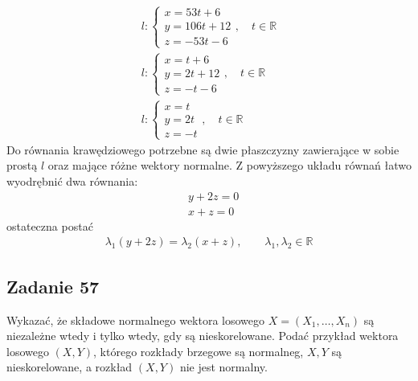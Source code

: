 \begin{gather*}
l:
\left \{
\begin{array}{l}
x=53t+6\\
y=106t+12\\
z=-53t-6
\end{array}
\right .,\quad t\in \mathbb R \\
l:
\left \{
\begin{array}{l}
x=t+6\\
y=2t+12\\
z=-t-6
\end{array}
\right .,\quad t\in \mathbb R \\
l:
\left \{
\begin{array}{l}
x=t\\
y=2t\\
z=-t
\end{array}
\right .,\quad t\in \mathbb R 
\end{gather*}
Do równania krawędziowego potrzebne są dwie płaszczyzny zawierające w sobie prostą $ l $ oraz mające różne wektory normalne. Z powyższego układu równań łatwo wyodrębnić dwa równania:
\begin{align*}
&y+2z=0\\
&x+z=0
\end{align*}
ostateczna postać
\begin{gather*}
\lambda_1(y+2z)=\lambda_2(x+z),\qquad\lambda_1,\lambda_2\in \mathbb R 
\end{gather*}



\subsection*{Zadanie 57}
Wykazać, że składowe normalnego wektora losowego $ X=(X_1,\dots,X_n) $ są niezależne wtedy i tylko wtedy, gdy są nieskorelowane. Podać przykład wektora losowego $ (X,Y) $, którego rozkłady brzegowe są normalneg, $ X,Y $ są nieskorelowane, a rozkład $ (X,Y) $ nie jest normalny.

